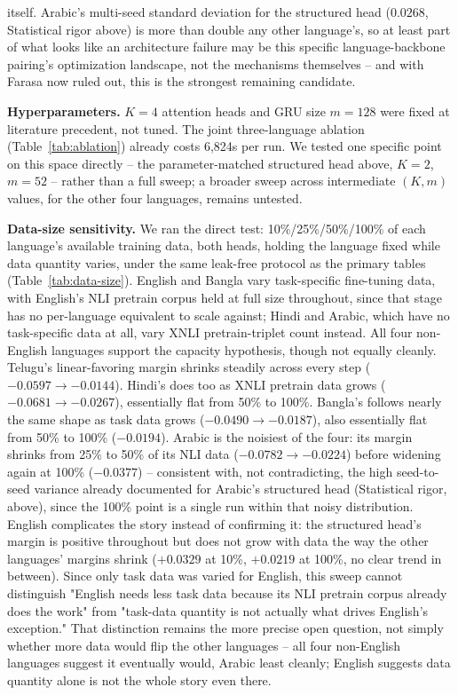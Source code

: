 \documentclass[manuscript]{acmart}
\begin{document}
itself. Arabic's multi-seed standard deviation for the structured head ($0.0268$, Statistical rigor above) is more than double any other language's, so at least part of what looks like an architecture failure may be this specific language-backbone pairing's optimization landscape, not the mechanisms themselves -- and with Farasa now ruled out, this is the strongest remaining candidate.

\textbf{Hyperparameters.} $K=4$ attention heads and GRU size $m=128$ were fixed at literature precedent, not tuned. The joint three-language ablation (Table~\ref{tab:ablation}) already costs 6{,}824s per run. We tested one specific point on this space directly -- the parameter-matched structured head above, $K{=}2$, $m{=}52$ -- rather than a full sweep; a broader sweep across intermediate $(K,m)$ values, for the other four languages, remains untested.

\textbf{Data-size sensitivity.} We ran the direct test: 10\%/25\%/50\%/100\% of each language's available training data, both heads, holding the language fixed while data quantity varies, under the same leak-free protocol as the primary tables (Table~\ref{tab:data-size}). English and Bangla vary task-specific fine-tuning data, with English's NLI pretrain corpus held at full size throughout, since that stage has no per-language equivalent to scale against; Hindi and Arabic, which have no task-specific data at all, vary XNLI pretrain-triplet count instead. All four non-English languages support the capacity hypothesis, though not equally cleanly. Telugu's linear-favoring margin shrinks steadily across every step ($-0.0597\to-0.0144$). Hindi's does too as XNLI pretrain data grows ($-0.0681\to-0.0267$), essentially flat from 50\% to 100\%. Bangla's follows nearly the same shape as task data grows ($-0.0490\to-0.0187$), also essentially flat from 50\% to 100\% ($-0.0194$). Arabic is the noisiest of the four: its margin shrinks from 25\% to 50\% of its NLI data ($-0.0782\to-0.0224$) before widening again at 100\% ($-0.0377$) -- consistent with, not contradicting, the high seed-to-seed variance already documented for Arabic's structured head (Statistical rigor, above), since the 100\% point is a single run within that noisy distribution. English complicates the story instead of confirming it: the structured head's margin is positive throughout but does not grow with data the way the other languages' margins shrink ($+0.0329$ at 10\%, $+0.0219$ at 100\%, no clear trend in between). Since only task data was varied for English, this sweep cannot distinguish "English needs less task data because its NLI pretrain corpus already does the work" from "task-data quantity is not actually what drives English's exception." That distinction remains the more precise open question, not simply whether more data would flip the other languages -- all four non-English languages suggest it eventually would, Arabic least cleanly; English suggests data quantity alone is not the whole story even there.
\end{document}

